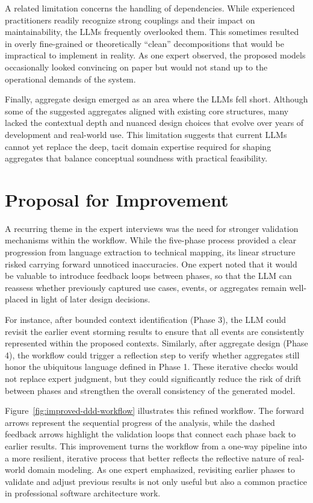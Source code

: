 A related limitation concerns the handling of dependencies. While experienced practitioners readily recognize strong couplings and their impact on maintainability, the LLMs frequently overlooked them. This sometimes resulted in overly fine-grained or theoretically “clean” decompositions that would be impractical to implement in reality. As one expert observed, the proposed models occasionally looked convincing on paper but would not stand up to the operational demands of the system.

Finally, aggregate design emerged as an area where the LLMs fell short. Although some of the suggested aggregates aligned with existing core structures, many lacked the contextual depth and nuanced design choices that evolve over years of development and real-world use. This limitation suggests that current LLMs cannot yet replace the deep, tacit domain expertise required for shaping aggregates that balance conceptual soundness with practical feasibility.

\section{Proposal for Improvement}

A recurring theme in the expert interviews was the need for stronger validation mechanisms within the workflow. While the five-phase process provided a clear progression from language extraction to technical mapping, its linear structure risked carrying forward unnoticed inaccuracies. One expert noted that it would be valuable to introduce feedback loops between phases, so that the LLM can reassess whether previously captured use cases, events, or aggregates remain well-placed in light of later design decisions.

For instance, after bounded context identification (Phase 3), the LLM could revisit the earlier event storming results to ensure that all events are consistently represented within the proposed contexts. Similarly, after aggregate design (Phase 4), the workflow could trigger a reflection step to verify whether aggregates still honor the ubiquitous language defined in Phase 1. These iterative checks would not replace expert judgment, but they could significantly reduce the risk of drift between phases and strengthen the overall consistency of the generated model.

Figure~\ref{fig:improved-ddd-workflow} illustrates this refined workflow. The forward arrows represent the sequential progress of the analysis, while the dashed feedback arrows highlight the validation loops that connect each phase back to earlier results. This improvement turns the workflow from a one-way pipeline into a more resilient, iterative process that better reflects the reflective nature of real-world domain modeling. As one expert emphasized, revisiting earlier phases to validate and adjust previous results is not only useful but also a common practice in professional software architecture work.


